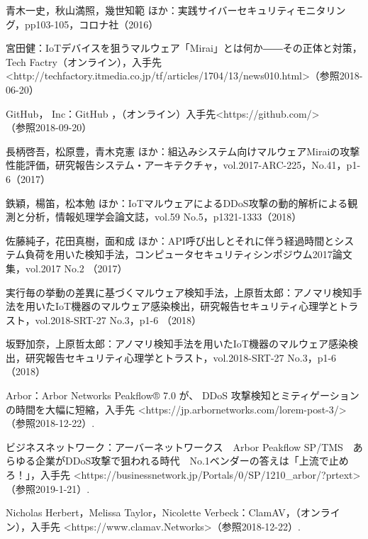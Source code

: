 \begin{thebibliography}{30}
        青木一史，秋山満照，幾世知範 ほか：実践サイバーセキュリティモニタリング，pp103-105，コロナ社（2016）
    
        宮田健：IoTデバイスを狙うマルウェア「Mirai」とは何か――その正体と対策，Tech Factry（オンライン），入手先\textless http:\slash\slash{}techfactory.itmedia.co.jp\slash{}tf\slash{}articles\slash{}1704\slash{}13\slash{}news010.html\textgreater（参照2018-06-20）
        
        GitHub， Inc：GitHub ，（オンライン）入手先\textless https:\slash\slash{}github.com\slash{}\textgreater\\（参照2018-09-20）
    
        長柄啓吾，松原豊，青木克憲 ほか：組込みシステム向けマルウェアMiraiの攻撃性能評価，研究報告システム・アーキテクチャ，vol.2017-ARC-225，No.41，p1-6（2017）
    
        鉄穎，楊笛，松本勉 ほか：IoTマルウェアによるDDoS攻撃の動的解析による観測と分析，情報処理学会論文誌，vol.59 No.5，p1321-1333（2018）

        佐藤純子，花田真樹，面和成 ほか：API呼び出しとそれに伴う経過時間とシステム負荷を用いた検知手法，コンピュータセキュリティシンポジウム2017論文集，vol.2017 No.2 （2017）

        実行毎の挙動の差異に基づくマルウェア検知手法，上原哲太郎：アノマリ検知手法を用いたIoT機器のマルウェア感染検出，研究報告セキュリティ心理学とトラスト，vol.2018-SRT-27 No.3，p1-6 （2018）

        坂野加奈，上原哲太郎：アノマリ検知手法を用いたIoT機器のマルウェア感染検出，研究報告セキュリティ心理学とトラスト，vol.2018-SRT-27 No.3，p1-6 （2018）

         Arbor：Arbor Networks Peakflow® 7.0 が、 DDoS 攻撃検知とミティゲーションの時間を大幅に短縮，入手先 \textless https:\slash\slash{}jp.arbornetworks.com\slash{}lorem-post-3\slash{}\textgreater （参照2018-12-22）.
    
         ビジネスネットワーク：アーバーネットワークス　Arbor Peakflow SP/TMS　あらゆる企業がDDoS攻撃で狙われる時代　No.1ベンダーの答えは「上流で止めろ！」，入手先 \textless https:\slash\slash{}businessnetwork.jp\slash{}Portals\slash{}0\slash{}SP\slash{}1210\_arbor\slash{}?prtext\textgreater （参照2019-1-21）.

         Nicholas Herbert，Melissa Taylor，Nicolette Verbeck：ClamAV，（オンライン），入手先 \textless https:\slash\slash{}www.clamav.Networks\textgreater（参照2018-12-22）.
    

\end{thebibliography}
